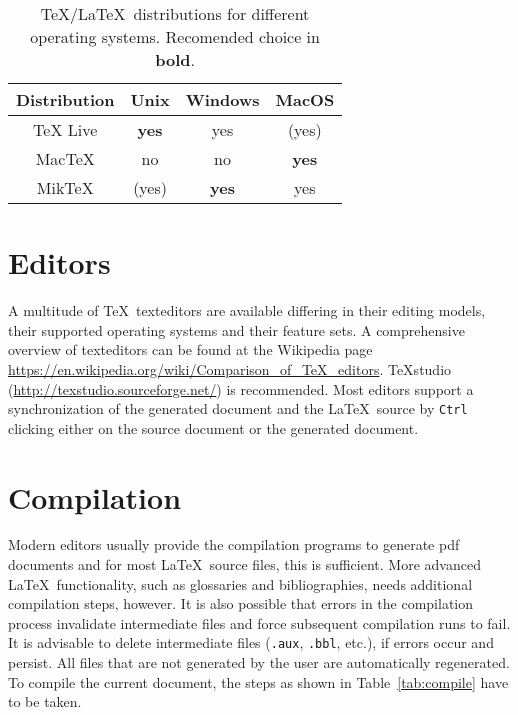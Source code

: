 \begin{table}
  \centering
  \begin{tabular}{cccc}
    \toprule
    Distribution & Unix         & Windows      & MacOS        \\
    \midrule
    TeX Live     & \textbf{yes} & yes          & (yes)        \\
    MacTeX       & no           & no           & \textbf{yes} \\
    MikTeX       & (yes)        & \textbf{yes} & yes          \\
    \bottomrule
  \end{tabular}
  \caption{\TeX/\LaTeX\ distributions for different operating systems. Recomended choice in \textbf{bold}.}
  \label{tab:distrib} %
\end{table}

\section{Editors}

A multitude of \TeX\ \glspl{texteditor} are available differing in their editing models, their supported operating systems and their feature sets.
A comprehensive overview of \glspl{texteditor} can be found at the Wikipedia page  \url{https://en.wikipedia.org/wiki/Comparison_of_TeX_editors}.
TeXstudio (\url{http://texstudio.sourceforge.net/}) is recommended.
Most editors support a synchronization of the generated document and the \LaTeX\ source by \verb|Ctrl| clicking either on the source document or the generated document.

\section{Compilation}

Modern editors usually provide the compilation programs to generate \gls{pdf} documents and for most \LaTeX\ source files, this is sufficient.
More advanced \LaTeX\ functionality, such as glossaries and bibliographies, needs additional compilation steps, however.
It is also possible that errors in the compilation process invalidate intermediate files and force subsequent compilation runs to fail.
It is advisable to delete intermediate files (\verb|.aux|, \verb|.bbl|, etc.), if errors occur and persist.
All files that are not generated by the user are automatically regenerated.
To compile the current document, the steps as shown in Table~\ref{tab:compile} have to be taken.


